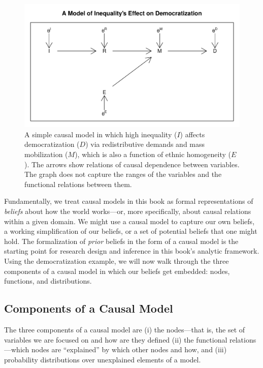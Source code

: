 \documentclass[
  12pt,
]{book}
\begin{document}
\begin{figure}

{\centering \includegraphics[width=0.8\linewidth]{ii_files/figure-latex/simpleDAG-1} 

}

\caption{A simple causal model in which high inequality ($I$) affects democratization ($D$) via redistributive demands and mass mobilization ($M$), which is also a function of ethnic homogeneity ($E$). The arrows show relations of causal dependence between variables.  The graph does not capture the ranges of the variables and the functional relations between them.}\label{fig:simpleDAG}
\end{figure}

Fundamentally, we treat causal models in this book as formal representations of \emph{beliefs} about how the world works---or, more specifically, about causal relations within a given domain. We might use a causal model to capture our own beliefs, a working simplification of our beliefs, or a set of potential beliefs that one might hold. The formalization of \emph{prior} beliefs in the form of a causal model is the starting point for research design and inference in this book's analytic framework. Using the democratization example, we will now walk through the three components of a causal model in which our beliefs get embedded: nodes, functions, and distributions.

\hypertarget{components-of-a-causal-model}{%
\subsection{Components of a Causal Model}\label{components-of-a-causal-model}}

The three components of a causal model are (i) the nodes---that is, the set of variables we are focused on and how are they defined (ii) the functional relations---which nodes are ``explained'' by which other nodes and how, and (iii) probability distributions over unexplained elements of a model.
\end{document}

